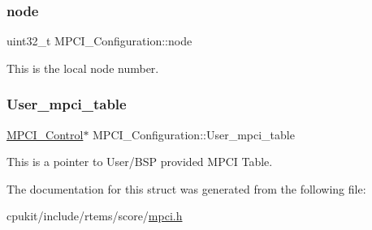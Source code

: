 \subsubsection{\texorpdfstring{node}{node}}
{\footnotesize\ttfamily uint32\+\_\+t M\+P\+C\+I\+\_\+\+Configuration\+::node}

This is the local node number. \mbox{\label{structMPCI__Configuration_a4ac9a792a717230de2e1f48de18e0bb6}} 
\subsubsection{\texorpdfstring{User\_mpci\_table}{User\_mpci\_table}}
{\footnotesize\ttfamily \mbox{\hyperlink{structMPCI__Control}{M\+P\+C\+I\+\_\+\+Control}}$\ast$ M\+P\+C\+I\+\_\+\+Configuration\+::\+User\+\_\+mpci\+\_\+table}

This is a pointer to User/\+B\+SP provided M\+P\+CI Table. 

The documentation for this struct was generated from the following file\+:\begin{DoxyCompactItemize}
\item 
cpukit/include/rtems/score/\mbox{\hyperlink{cpukit_2include_2rtems_2score_2mpci_8h}{mpci.\+h}}\end{DoxyCompactItemize}
